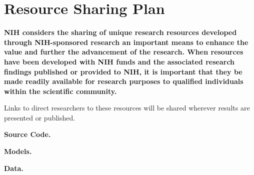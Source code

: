 \documentclass[11pt]{article}
\begin{document}
\section*{Resource Sharing Plan}

\textbf{NIH considers the sharing of unique research resources developed through NIH-sponsored
research an important means to enhance the value and further the advancement of the research.
When resources have been developed with NIH funds and the associated research findings
published or provided to NIH, it is important that they be made readily available for research
purposes to qualified individuals within the scientific community. }

Links to direct researchers to these resources will be shared wherever results are presented or published.

\textbf{Source Code.} \lipsum[110]

\textbf{Models.} \lipsum[109]
 
\textbf{Data.} \lipsum[108]
\end{document}
